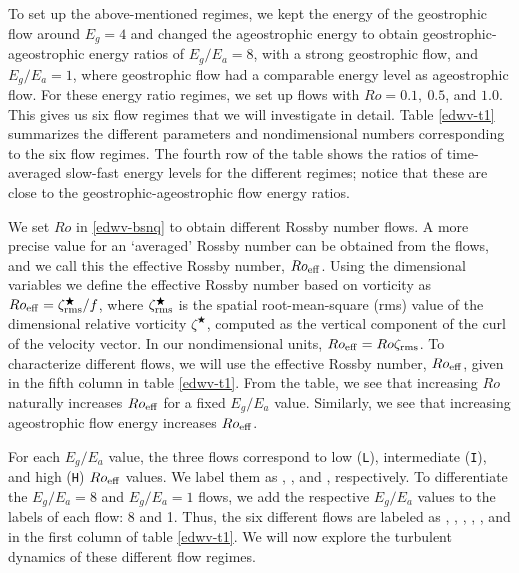 \documentclass[../Rajarshi-thesis-draft.tex]{subfiles}
\begin{document}
To set up the above-mentioned regimes, we kept the energy of the geostrophic flow around $E_g = 4$ and changed the ageostrophic energy to obtain geostrophic-ageostrophic energy ratios of $E_g/E_a = 8$, with a strong geostrophic flow,  and $E_g/E_a =1$, where geostrophic flow had a comparable energy level as ageostrophic flow. For these energy ratio regimes, we set up flows with  $Ro = 0.1, \ 0.5$, and $1.0$. This gives us six flow regimes that we will investigate in detail.  Table \ref{edwv-t1} summarizes the different parameters and nondimensional numbers corresponding to the six flow regimes. The fourth row of the table shows the ratios of time-averaged slow-fast energy levels for the different regimes; notice that these are close to the geostrophic-ageostrophic flow energy ratios.


We set  $Ro$ in \eqref{edwv-bsnq} to obtain different Rossby number flows. A more precise value for an `averaged' Rossby number can be obtained from the flows, and we call this the effective Rossby number,  $Ro_{\operatorname{eff}}$.  Using the dimensional variables we define the effective Rossby number based on vorticity as $Ro_{\operatorname{eff}} = \zeta_{\operatorname{rms}}^\bigstar/f$, where $\zeta_{\operatorname{rms}}^\bigstar$ is the spatial root-mean-square (rms) value of the dimensional relative vorticity $\zeta^\bigstar$, computed as the vertical component of the curl of the velocity vector. In our nondimensional units, $Ro_{\operatorname{eff}} = Ro \zeta_{\operatorname{rms}}$. To characterize different flows, we will use the effective Rossby number, $Ro_{\operatorname{eff}}$,  given in the fifth column in table \ref{edwv-t1}. From the table, we see that increasing $Ro$ naturally increases $Ro_{\operatorname{eff}}$ for a fixed $E_g/E_a$ value. Similarly,  we see that increasing ageostrophic flow energy increases $Ro_{\operatorname{eff}}$. 


For each $E_g/E_a$ value, the three flows correspond to low  (\texttt{L}), intermediate (\texttt{I}), and high (\texttt{H}) $Ro_{\operatorname{eff}}$ values. We label them as \lr, \ir, and \hr, respectively. To differentiate the $E_g/E_a = 8$ and $E_g/E_a = 1$ flows, we add the respective $E_g/E_a$ values to the labels of each flow: 8 and 1. Thus, the six different flows are labeled as \lre, \ire, \hre, \lro, \iro, and \hro in the first column of table \ref{edwv-t1}. We will now explore the turbulent dynamics of these different flow regimes. 
\end{document}
